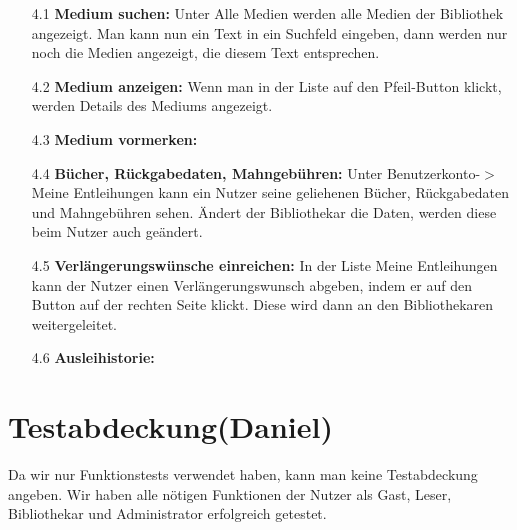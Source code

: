 \documentclass[fontsize=12pt,paper=a4,twoside]{scrartcl}
\begin{document}
\begin{itemize}
\item[4.1]\textbf{Medium suchen:} Unter Alle Medien werden alle Medien der Bibliothek angezeigt. Man kann nun ein Text in ein Suchfeld eingeben, dann werden nur noch die Medien angezeigt, die diesem Text entsprechen.
\item[4.2]\textbf{Medium anzeigen:} Wenn man in der Liste auf den Pfeil-Button klickt, werden Details des Mediums angezeigt.
\item[4.3]\textbf{Medium vormerken:}
\item[4.4]\textbf{Bücher, Rückgabedaten, Mahngebühren:} Unter Benutzerkonto-$>$Meine Entleihungen kann ein Nutzer seine geliehenen Bücher, Rückgabedaten und Mahngebühren sehen. Ändert der Bibliothekar die Daten, werden diese beim Nutzer auch geändert.
\item[4.5]\textbf{Verlängerungswünsche einreichen:} In der Liste Meine Entleihungen kann der Nutzer einen Verlängerungswunsch abgeben, indem er auf den Button auf der rechten Seite klickt. Diese wird dann an den Bibliothekaren weitergeleitet.
\item[4.6]\textbf{Ausleihistorie:}
\end{itemize}
\bigskip

\section{Testabdeckung(Daniel)}

Da wir nur Funktionstests verwendet haben, kann man keine Testabdeckung angeben. Wir haben alle nötigen Funktionen der Nutzer als Gast, Leser, Bibliothekar und Administrator erfolgreich getestet.
\end{document}
